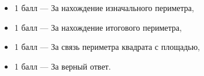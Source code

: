 \begin{itemize}
	\item{1 балл} --- За нахождение изначального периметра,
	\item{1 балл} --- За нахождение итогового периметра,
	\item{1 балл} --- За связь периметра квадрата с площадью,
	\item{1 балл} --- За верный ответ.
\end{itemize}